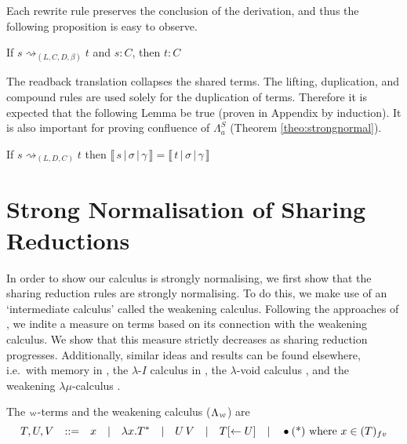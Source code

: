 \documentclass[a4paper,UKenglish,cleveref, autoref]{lipics-v2019}
\newcommand{\FALC}{\Lambda^{S}_{a}}
\newcommand{\WEAK}{\Lambda_{\weaksymbol}}
\newcommand{\fv}[1]{(#1)_{fv}}
\newcommand{\abs}[2]{\lambda #1 . #2}
\newcommand{\app}[2]{#1 \, #2}
\newcommand{\share}[3]{#1 [#2 \leftarrow #3]}
\newcommand{\weaksymbol}{\mbox{\tiny $\mathcal{W}$}}
\newcommand{\readbackwmap}[3]{\llbracket \, #1 \, \vert \, #2 \, \vert \, #3  \, \rrbracket }
\begin{document}
Each rewrite rule preserves the conclusion of the derivation, and thus the following proposition is easy to observe.

\begin{proposition}
If $s \rightsquigarrow_{(L, C, D, \beta)} t$ and $s : C$, then $t : C$
\end{proposition}

\noindent The readback translation collapses the shared terms. The lifting, duplication, and compound rules are used solely for the duplication of terms. Therefore it is expected that the following Lemma be true (proven in Appendix by induction). It is also important for proving confluence of $\FALC$ (Theorem \ref{theo:strongnormal}).

\begin{lemma}
\label{lem:preservesdenotation}
 If $s \rightsquigarrow_{(L, D, C)} t$ then $\readbackwmap{s}{\sigma}{\gamma} = \readbackwmap{t}{\sigma}{\gamma}$
\end{lemma}

\section{Strong Normalisation of Sharing Reductions}
\label{chap:snosr}

In order to show our calculus is strongly normalising, we first show that the sharing reduction rules are strongly normalising. To do this, we make use of an `intermediate calculus' called the weakening calculus. Following the approaches of \cite{gundersen2013atomic}, we indite a measure on terms based on its connection with the weakening calculus. We show that this measure strictly decreases as sharing reduction progresses. Additionally, similar ideas and results can be found elsewhere, i.e.\ with memory in \cite{klop1980thesis}, the $\lambda$-$I$ calculus in \cite{barendregt1984lambda}, the $\lambda$-void calculus \cite{kesneraccattoli12}, and the weakening $\lambda\mu$-calculus \cite{he2018atomic}.


\begin{definition}
\label{def:weakterms}
The $\weaksymbol$-terms and the weakening calculus ($\WEAK$) are
\begin{equation*}
	T, U, V \quad {:}{:}{=} \quad x \quad \vert \quad \abs{x}{T^{*}}\quad \vert \quad \app{U}{V} \quad \vert \quad \share{T}{}{U} \quad \vert \quad \bullet \hfill \text{(*) where $x \in \fv{T}$}
\end{equation*}
\end{definition}
\end{document}
